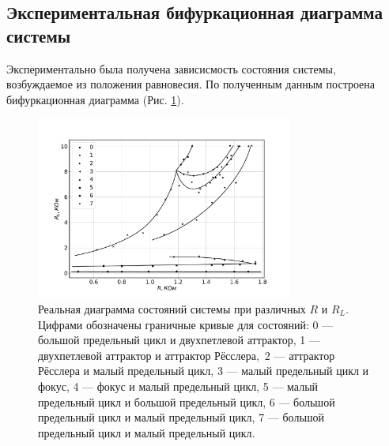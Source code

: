 \documentclass[12pt]{article}
\begin{document}
\subsection*{Экспериментальная бифуркационная диаграмма системы}
Экспериментально была получена зависисмость состояния системы, возбуждаемое из положения равновесия. По
полученным данным построена бифуркационная диаграмма (Рис. \ref{fig:real_bif_diag}).
\begin{figure}[H]
	\centering
	\includegraphics[width=0.75\textwidth]{bif_diag_lines.pdf}
	\caption{Реальная диаграмма состояний системы при различных $R$ и $R_L$.
		Цифрами обозначены граничные кривые для состояний:
		0 --- большой предельный цикл и двухпетлевой аттрактор,
		1 --- двухпетлевой аттрактор и аттрактор Рёсслера,\
		2 --- аттрактор Рёсслера и малый предельный цикл,
		3 --- малый предельный цикл и фокус,
		4 --- фокус и малый предельный цикл,
		5 --- малый предельный цикл и большой предельный цикл,
		6 --- большой предельный цикл и малый предельный цикл,
		7 --- большой предельный цикл и малый предельный цикл.}
	\label{fig:real_bif_diag}
\end{figure}
\end{document}
